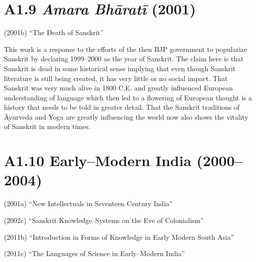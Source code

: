 \vspace{-.3cm}

\section*{A1.9 \textit{Amara Bhāratī} (2001)}

(2001b) “The Death of Sanskrit”

This work is a response to the efforts of the then BJP government to popularize Sanskrit by declaring 1999–2000 as the year of Sanskrit. The claim here is that Sanskrit is dead in some historical sense implying that even though Sanskrit literature is still being created, it has very little or no social impact. That Sanskrit was very much alive in 1800 C.E. and greatly influenced European understanding of language which then led to a flowering of European thought is a history that needs to be told in greater detail. That the Sanskrit traditions of Āyurveda and Yoga are greatly influencing the world now also shows the vitality of Sanskrit in modern times.

\vspace{-.3cm}

\section*{A1.10 Early–Modern India (2000–2004)}

\vspace {-.2cm}

(2001a) “New Intellectuals in Seventeen Century India”

(2002c) “Sanskrit Knowledge–Systems on the Eve of Colonialism”

(2011b) “Introduction in Forms of Knowledge in Early Modern South Asia”

(2011c) “The Languages of Science in Early–Modern India”

